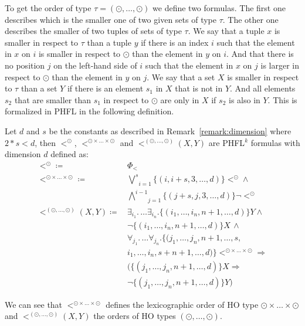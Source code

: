 To get the order of type $\tau = (\odot, \dots, \odot)$ we define two formulas. The first one describes which is the smaller one of two given sets of type $\tau$. The other one describes the smaller of two tuples of sets of type $\tau$. We say that a tuple $x$ is smaller in respect to $
\tau$ than a tuple $y$ if there is an index $i$ such that the element in $x$ on $i$ is smaller in 
respect to $\odot$ than the element in $y$ on $i$. And that there is no position $j$ on the left-hand side of $i$ such 
that the element in $x$ on $j$ is larger in respect to $\odot$ than the element in $y$ on $j$. 
We say that a set $X$ is smaller in respect to $\tau$ than a set $Y$ if there is an element 
$s_1$ in $X$ that is not in $Y$. And all elements $s_2$ that are smaller than $s_1$ in respect to $\odot$ 
are only in $X$ if $s_2$ is also in $Y$. This is formalized in PHFL in the following definition.

\begin{definition}
    \label{definition:lower_bound_less_second}
    Let $d$ and $s$ be the constants as described in Remark~\ref{remark:dimension} where $2*s < d$, then $<^\odot$, $<^{\odot \times \dots
    \times \odot}$ and $<^{(\odot, \dots, \odot)}(X, Y)$ are PHFL$^k$ formulas with dimension $d$ defined as:
    \begin{align*}
        <^\odot \coloneqq &\,\Phi_< \\
        <^{\odot \times \dots \times \odot} \coloneqq
            &\,\underset{i = 1}{\overset{s}{\bigvee}}\{(i, i + s, 3, \dots, d)\} <^\odot \wedge \\
            &\,\underset{j = 1}{\overset{i - 1}{\bigwedge}}\{(j + s, j, 3, \dots, d)\} \neg <^\odot \\
        <^{(\odot, \dots, \odot)}(X, Y) \coloneqq
            &\,\exists_{i_1}.\, \dots \exists_{i_n}. \{(i_1, \dots, i_n, n + 1,\dots, d)\}Y \wedge \\
            &\,\neg \{(i_1, \dots, i_n, n + 1, \dots, d)\} X\,\wedge \\
            &\, \forall_{j_1}. \,\dots \forall_{j_n}. \{(j_1, \dots, j_n, n+1, \dots, s, \\
            &\,i_1, \dots, i_n, s + n + 1, \dots,  d)\}<^{\odot \times \dots \times \odot} \Rightarrow \\
            &\,(\{(j_1,\dots, j_n, n + 1, \dots, d)\} X \Rightarrow \\
            &\,\neg \{(j_1, \dots, j_n, n + 1, \dots, d)\} Y)
    \end{align*}
\end{definition}
We can see that  $<^{\odot \times \dots \times \odot}$ defines the lexicographic order of HO type $\odot \times \dots \times \odot$ and $<^{(\odot, \dots, \odot)}(X, Y)$ the orders of HO types $(\odot, \dots, \odot)$.

